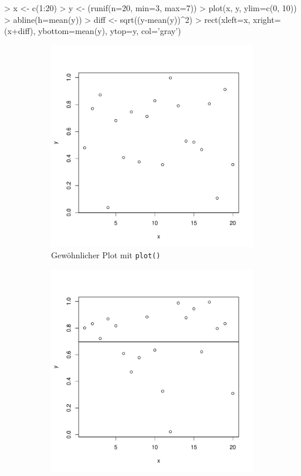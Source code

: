 \begin{Schunk}
\begin{Sinput}
> x <- c(1:20)
> y <- (runif(n=20, min=3, max=7))
> plot(x, y, ylim=c(0, 10))
> abline(h=mean(y))
> diff <- sqrt((y-mean(y))^2)
> rect(xleft=x, xright=(x+diff), ybottom=mean(y), ytop=y, col='gray')
\end{Sinput}
\end{Schunk}

\begin{figure}[h!]
\centering
\begin{subfigure}[b]{0.48\textwidth}
\includegraphics{r-cmd-014}
\caption{Gewöhnlicher Plot mit \lstinline{plot()}}
\end{subfigure}
\begin{subfigure}[b]{0.48\textwidth}
\includegraphics{r-cmd-015}

\end{subfigure}
\end{figure}
